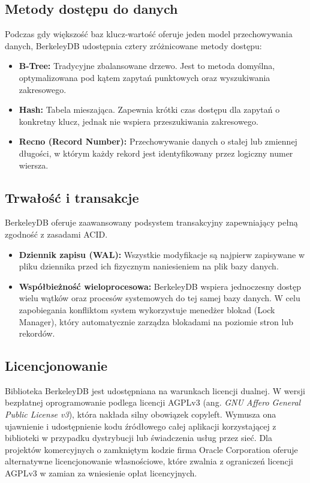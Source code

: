 \subsection{Metody dostępu do danych}
Podczas gdy większość baz klucz-wartość oferuje jeden model przechowywania danych, BerkeleyDB udostępnia cztery zróżnicowane metody dostępu:
\begin{itemize}
    \item \textbf{B-Tree:} Tradycyjne zbalansowane drzewo. Jest to metoda domyślna, optymalizowana pod kątem zapytań punktowych oraz wyszukiwania zakresowego.
    \item \textbf{Hash:} Tabela mieszająca. Zapewnia krótki czas dostępu dla zapytań o konkretny klucz, jednak nie wspiera przeszukiwania zakresowego.
    \item \textbf{Recno (Record Number):} Przechowywanie danych o stałej lub zmiennej długości, w którym każdy rekord jest identyfikowany przez logiczny numer wiersza.
\end{itemize}

\subsection{Trwałość i transakcje}
BerkeleyDB oferuje zaawansowany podsystem transakcyjny zapewniający pełną zgodność z zasadami ACID.
\begin{itemize}
    \item \textbf{Dziennik zapisu (WAL):} Wszystkie modyfikacje są najpierw zapisywane w pliku dziennika przed ich fizycznym naniesieniem na plik bazy danych.
    \item \textbf{Współbieżność wieloprocesowa:} BerkeleyDB wspiera jednoczesny dostęp wielu wątków oraz procesów systemowych do tej samej bazy danych. W celu zapobiegania konfliktom system wykorzystuje menedżer blokad (Lock Manager), który automatycznie zarządza blokadami na poziomie stron lub rekordów.
\end{itemize}

\subsection{Licencjonowanie}
Biblioteka BerkeleyDB jest udostępniana na warunkach licencji dualnej. W wersji bezpłatnej oprogramowanie podlega licencji AGPLv3 (ang. \emph{GNU Affero General Public License v3}), która nakłada silny obowiązek copyleft. Wymusza ona ujawnienie i udostępnienie kodu źródłowego całej aplikacji korzystającej z biblioteki w przypadku dystrybucji lub świadczenia usług przez sieć. Dla projektów komercyjnych o zamkniętym kodzie firma Oracle Corporation oferuje alternatywne licencjonowanie własnościowe, które zwalnia z ograniczeń licencji AGPLv3 w zamian za wniesienie opłat licencyjnych.

